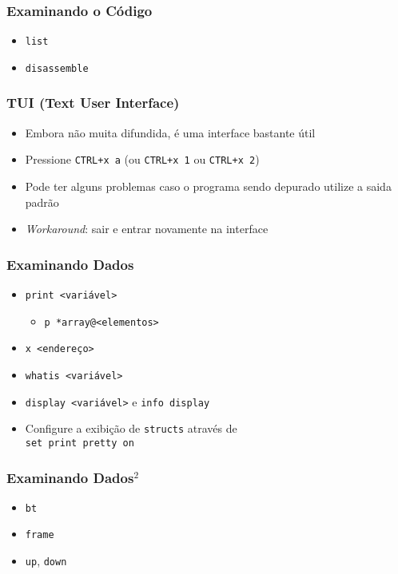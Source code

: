 \documentclass[xcolor=pdftex,dvipsnames,table,t]{beamer}
\begin{document}
\begin{frame}[fragile]
	\frametitle{Examinando o Código}
	  \begin{itemize}
	    \item{\verb|list|}
	    \item{\verb|disassemble|}
	  \end{itemize}
\end{frame}

\begin{frame}[fragile]
	\frametitle{TUI (Text User Interface)}
	  \begin{itemize}
	    \item{Embora não muita difundida, é uma interface bastante útil}
	    \item{Pressione \verb|CTRL+x a| (ou \verb|CTRL+x 1| ou \verb|CTRL+x 2|)}
	    \item{Pode ter alguns problemas caso o programa sendo depurado utilize a saida padrão}
	    \item{\textit{Workaround}: sair e entrar novamente na interface}
	  \end{itemize}
\end{frame}

\begin{frame}[fragile]
	\frametitle{Examinando Dados}
	  \begin{itemize}
	    \item{\verb|print <variável>|}
	    \begin{itemize}
	      \item{\verb|p *array@<elementos>|}
	    \end{itemize}
	    \item{\verb|x <endereço>|}
	    \item{\verb|whatis <variável>|}
	    \item{\verb|display <variável>| e \verb|info display|}
	    \item{Configure a exibição de \verb|structs| através de \\
		  \verb|set print pretty on|}
	  \end{itemize}
\end{frame}

\begin{frame}[fragile]
	\frametitle{Examinando Dados$^2$}
	  \begin{itemize}
	    \item{\verb|bt|}
	    \item{\verb|frame|}
	    \item{\verb|up|, \verb|down|}
	  \end{itemize}
\end{frame}
\end{document}
